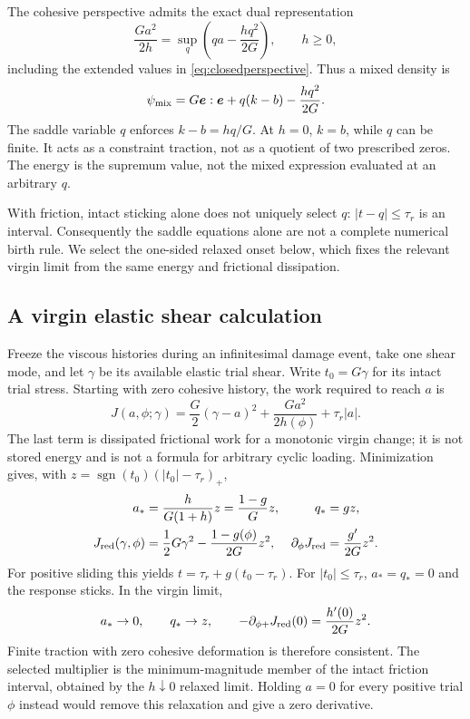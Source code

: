 \documentclass[11pt,a4paper]{article}
\numberwithin{equation}{section}
\newcommand{\sgn}{\operatorname{sgn}}
\begin{document}
The cohesive perspective admits the exact dual representation
\begin{equation}
 \frac{Ga^2}{2h}
   =\sup_q\left(qa-\frac{h q^2}{2G}\right),\qquad h\geq0,
 \label{eq:dual}
\end{equation}
including the extended values in \eqref{eq:closedperspective}.
Thus a mixed density is
\begin{equation}
 \psi_{\rm mix}=G\bm e:\bm e+q(k-b)-\frac{h q^2}{2G}.
 \label{eq:mixed}
\end{equation}
The saddle variable $q$ enforces $k-b=hq/G$.
At $h=0$, $k=b$, while $q$ can be finite. It acts as a constraint traction,
not as a quotient of two prescribed zeros.
The energy is the supremum value, not the mixed expression evaluated at an
arbitrary $q$.

With friction, intact sticking alone does not uniquely select $q$:
$|t-q|\leq\tau_r$ is an interval.
Consequently the saddle equations alone are not a complete numerical birth
rule. We select the one-sided relaxed onset below, which fixes the relevant
virgin limit from the same energy and frictional dissipation.

\subsection{A virgin elastic shear calculation}

Freeze the viscous histories during an infinitesimal damage event, take one
shear mode, and let $\gamma$ be its available elastic trial shear.
Write $t_0=G\gamma$ for its intact trial stress. Starting with zero cohesive
history, the work required to reach $a$ is
\begin{equation}
 J(a,\phi;\gamma)
   =\frac G2(\gamma-a)^2+\frac{Ga^2}{2h(\phi)}
       +\tau_r|a|.
 \label{eq:Jvirgin}
\end{equation}
The last term is dissipated frictional work for a monotonic virgin change;
it is not stored energy and is not a formula for arbitrary cyclic loading.
Minimization gives, with
$z=\sgn(t_0)(|t_0|-\tau_r)_+$,
\begin{align}
 a_*&=\frac{h}{G(1+h)}z
       =\frac{1-g}{G}z,&
 q_*&=g z, \label{eq:soft}\\
 J_{\rm red}(\gamma,\phi)
     &=\frac12G\gamma^2-\frac{1-g(\phi)}{2G}z^2,&
 \partial_\phi J_{\rm red}&=\frac{g'}{2G}z^2.
 \label{eq:Jred}
\end{align}
For positive sliding this yields
$t=\tau_r+g(t_0-\tau_r)$.
For $|t_0|\leq\tau_r$, $a_*=q_*=0$ and the response sticks.
In the virgin limit,
\begin{equation}
 a_*\to0,\qquad q_*\to z,\qquad
 -\partial_{\phi+}J_{\rm red}(0)=\frac{h'(0)}{2G}z^2.
 \label{eq:intactforce}
\end{equation}
Finite traction with zero cohesive deformation is therefore consistent.
The selected multiplier is the minimum-magnitude member of the intact
friction interval, obtained by the $h\downarrow0$ relaxed limit.
Holding $a=0$ for every positive trial $\phi$ instead would remove this
relaxation and give a zero derivative.
\end{document}
